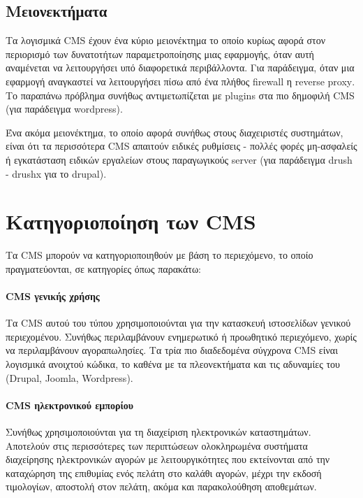 \documentclass[12pt]{report}
\begin{document}
\subsection{Μειονεκτήματα}
Τα λογισμικά \textlatin{CMS} έχουν ένα κύριο μειονέκτημα το οποίο κυρίως αφορά στον περιορισμό των δυνατοτήτων παραμετροποίησης μιας εφαρμογής, όταν αυτή αναμένεται να λειτουργήσει υπό διαφορετικά περιβάλλοντα. Για παράδειγμα, όταν μια εφαρμογή αναγκαστεί να λειτουργήσει πίσω από ένα πλήθος \textlatin{firewall} η \textlatin{reverse proxy}. Το παραπάνω πρόβλημα συνήθως αντιμετωπίζεται με \textlatin{plugins} στα πιο δημοφιλή \textlatin{CMS} (για παράδειγμα \textlatin{wordpress}).

Ένα ακόμα μειονέκτημα, το οποίο αφορά συνήθως στους διαχειριστές συστημάτων, είναι ότι τα περισσότερα \textlatin{CMS} απαιτούν ειδικές ρυθμίσεις - πολλές φορές μη-ασφαλείς ή εγκατάσταση ειδικών εργαλείων στους παραγωγικούς \textlatin{server} (για παράδειγμα \textlatin{drush - drushx} για το \textlatin{drupal}).

\section{Κατηγοριοποίηση των \textlatin{CMS}}
Τα \textlatin{CMS} μπορούν να κατηγοριοποιηθούν με βάση το περιεχόμενο, το οποίο πραγματεύονται, σε κατηγορίες όπως παρακάτω:

\paragraph{\textlatin{CMS} γενικής χρήσης} Τα \textlatin{CMS} αυτού του τύπου χρησιμοποιούνται για την κατασκευή ιστοσελίδων γενικού περιεχομένου. Συνήθως περιλαμβάνουν ενημερωτικό ή προωθητικό περιεχόμενο, χωρίς να περιλαμβάνουν αγοραπωλησίες. Τα τρία πιο διαδεδομένα σύγχρονα \textlatin{CMS} είναι λογισμικά ανοιχτού κώδικα, το καθένα με τα πλεονεκτήματα και τις αδυναμίες του (\textlatin{Drupal, Joomla, Wordpress}).

\paragraph{\textlatin{CMS} ηλεκτρονικού εμπορίου} Συνήθως χρησιμοποιούνται για τη διαχείριση ηλεκτρονικών καταστημάτων. Αποτελούν στις περισσότερες των περιπτώσεων ολοκληρωμένα συστήματα διαχείρησης ηλεκτρονικών αγορών με λειτουργικότητες που εκτείνονται από την καταχώρηση της επιθυμίας ενός πελάτη στο καλάθι αγορών, μέχρι την εκδοσή τιμολογίων, αποστολή στον πελάτη, ακόμα και παρακολούθηση αποθεμάτων.
\end{document}
